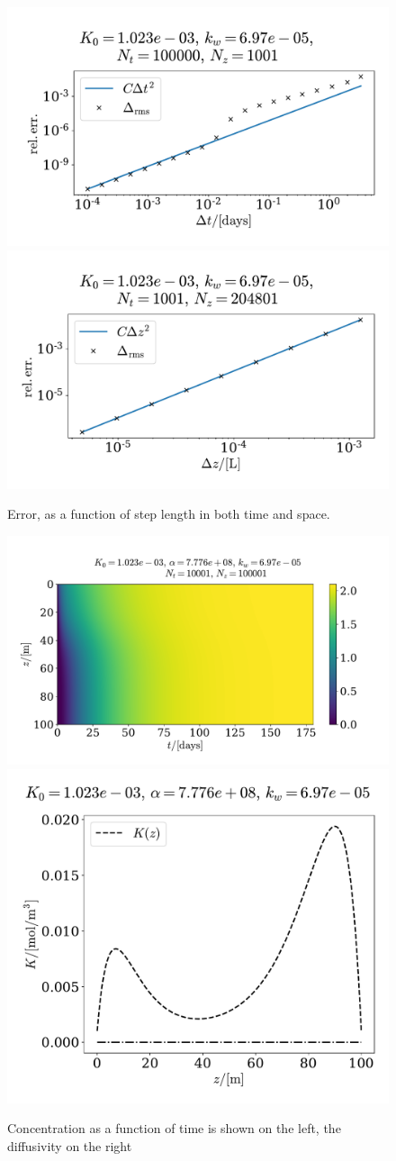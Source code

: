 \documentclass{article}
\begin{document}
    \begin{figure}[H]
        \centering
        \includegraphics[width=.49\textwidth]{../plots/prob2_conv_test_t}
        \includegraphics[width=.49\textwidth]{../plots/prob2_conv_test_z}
        \caption{Error, as a function of step length in both time and space.}
        \label{prob2 conv}
    \end{figure}


    \begin{figure}[H]
        \centering
        \includegraphics[width=.6\textwidth]{../plots/prob2}
        \includegraphics[width=.39\textwidth]{../plots/prob2_K}
        \caption{Concentration as a function of time is shown on the left, the diffusivity on the right}
        \label{prob2}
    \end{figure}
\end{document}
